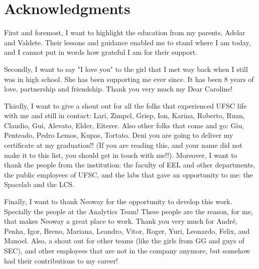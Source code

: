\thispagestyle{plain}

\section*{Acknowledgments}

\indent First and foremost, I want to highlight the education from my parents, Adelar and Valdete. Their lessons and guidance enabled me to stand where I am today, and I cannot put in words how grateful I am for their support.

Secondly, I want to say "I love you" to the girl that I met way back when I still was in high school. She has been supporting me ever since. It has been 8 years of love, partnership and friendship. Thank you very much my Dear Caroline!

Thirdly, I want to give a shout out for all the folks that experienced UFSC life with me and still in contact: Lari, Zimpel, Griep, Ion, Karina, Roberto, Ruan, Claudio, Gui, Alevato, Elder, Eiterer. Also other folks that come and go: Giu, Penteado, Pedro Lemos, Kupas, Tortato. Deni you are going to deliver my certificate at my graduation!! (If you are reading this, and your name did not make it to this list, you should get in touch with me!!). Moreover, I want to thank the people from the institution: the faculty of EEL and other departments, the public employees of UFSC, and the labs that gave an opportunity to me: the Spacelab and the LCS.

Finally, I want to thank Neoway for the opportunity to develop this work. Specially the people at the Analytics Team! These people are the reason, for me, that makes Neoway a great place to work. Thank you very much for André, Penha, Igor, Breno, Mariana, Leandro, Vitor, Roger, Yuri, Leonardo, Felix, and Manoel. Also, a shout out for other teams (like the girls from GG and guys of SEC), and other employees that are not in the company anymore, but somehow had their contributions to my career!



\cleardoublepageempty
